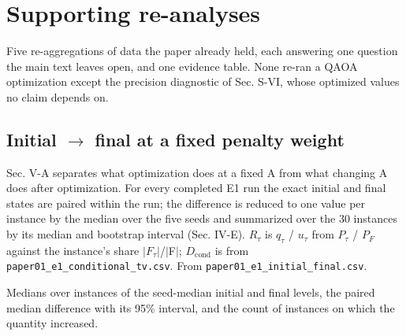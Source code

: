 \documentclass[journal]{IEEEtran}
\begin{document}
\section{Supporting re-analyses}


Five re-aggregations of data the paper already held, each answering one question the main text leaves open, and one evidence table. None re-ran a QAOA optimization except the precision diagnostic of Sec. S-VI, whose optimized values no claim depends on.


\subsection{Initial $\rightarrow$ final at a fixed penalty weight}


Sec. V-A separates what optimization does at a fixed A from what changing A does after optimization. For every completed E1 run the exact initial and final states are paired within the run; the difference is reduced to one value per instance by the median over the five seeds and summarized over the 30 instances by its median and bootstrap interval (Sec. IV-E). $R_{\tau}$ is $q_{\tau}$ / $u_{\tau}$ from $P_{\tau}$ / $P_{F}$ against the instance's share $|$$F_{\tau}$$|$/$|$F$|$; $D_{\mathrm{cond}}$ is from \texttt{paper01\_e1\_conditional\_tv.csv}. From \texttt{paper01\_e1\_initial\_final.csv}.


Medians over instances of the seed-median initial and final levels, the paired median difference with its 95\% interval, and the count of instances on which the quantity increased.
\end{document}
